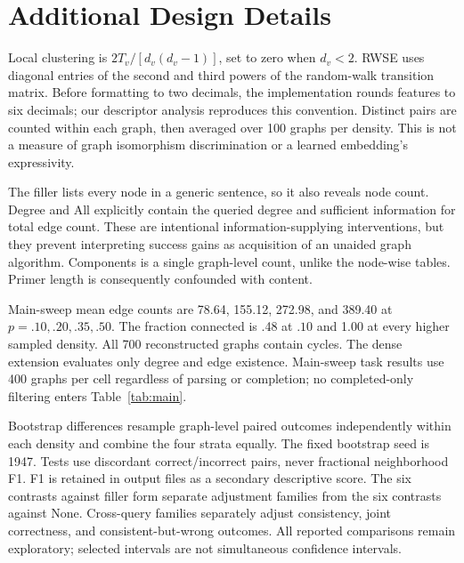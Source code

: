 \documentclass[11pt]{article}
\begin{document}
\section{Additional Design Details}
Local clustering is $2T_v/[d_v(d_v-1)]$, set to zero when $d_v<2$. RWSE uses diagonal entries of the second and third powers of the random-walk transition matrix. Before formatting to two decimals, the implementation rounds features to six decimals; our descriptor analysis reproduces this convention. Distinct pairs are counted within each graph, then averaged over 100 graphs per density. This is not a measure of graph isomorphism discrimination or a learned embedding's expressivity.

The filler lists every node in a generic sentence, so it also reveals node count. Degree and All explicitly contain the queried degree and sufficient information for total edge count. These are intentional information-supplying interventions, but they prevent interpreting success gains as acquisition of an unaided graph algorithm. Components is a single graph-level count, unlike the node-wise tables. Primer length is consequently confounded with content.

Main-sweep mean edge counts are 78.64, 155.12, 272.98, and 389.40 at $p=.10,.20,.35,.50$. The fraction connected is .48 at $.10$ and 1.00 at every higher sampled density. All 700 reconstructed graphs contain cycles. The dense extension evaluates only degree and edge existence. Main-sweep task results use 400 graphs per cell regardless of parsing or completion; no completed-only filtering enters Table~\ref{tab:main}.

Bootstrap differences resample graph-level paired outcomes independently within each density and combine the four strata equally. The fixed bootstrap seed is 1947. Tests use discordant correct/incorrect pairs, never fractional neighborhood F1. F1 is retained in output files as a secondary descriptive score. The six contrasts against filler form separate adjustment families from the six contrasts against None. Cross-query families separately adjust consistency, joint correctness, and consistent-but-wrong outcomes. All reported comparisons remain exploratory; selected intervals are not simultaneous confidence intervals.
\end{document}
